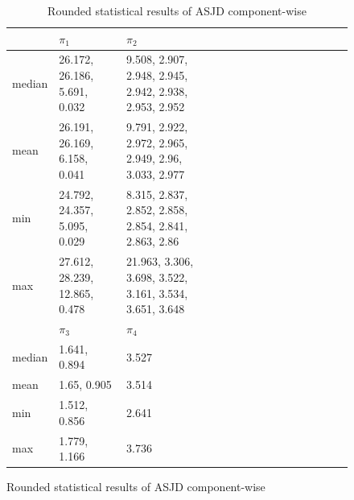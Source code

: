 \documentclass{scrartcl}
\begin{document}
    \begin{figure}[H]
        \begin{table}[H]
            \centering
            \begin{tabular}{|l|l|l|l|l|l|l|l|l|l|l|l|l|l|l|}
                \hline & $\pi_1$ & $\pi_2$ \\ \hline
                median & 26.172, 26.186, 5.691, 0.032 & 9.508, 2.907, 2.948, 2.945, 2.942, 2.938, 2.953, 2.952 \\\hline
                mean & 26.191, 26.169, 6.158, 0.041 & 9.791, 2.922, 2.972, 2.965, 2.949, 2.96, 3.033, 2.977 \\\hline
                min & 24.792, 24.357, 5.095, 0.029 & 8.315, 2.837, 2.852, 2.858, 2.854, 2.841, 2.863, 2.86 \\\hline
                max & 27.612, 28.239, 12.865, 0.478 & 21.963, 3.306, 3.698, 3.522, 3.161, 3.534, 3.651, 3.648 \\\hline
                \hline & $\pi_3$ & $\pi_4$ \\ \hline
                median & 1.641, 0.894 & 3.527 \\\hline
                mean & 1.65, 0.905 & 3.514 \\\hline
                min & 1.512, 0.856 & 2.641 \\\hline
                max & 1.779, 1.166 & 3.736 \\\hline
            \end{tabular}
            \caption{Rounded statistical results of ASJD component-wise}
            \label{stat_results_asjd}
        \end{table}
    \end{figure}
\end{document}
